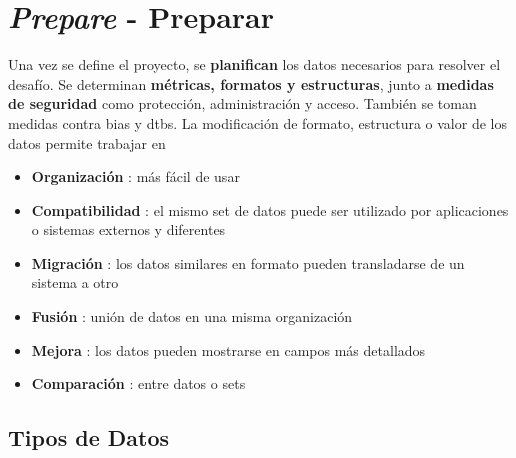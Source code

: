 

\section{\textit{Prepare} - Preparar}
Una vez se define el proyecto, se \textbf{planifican} los datos necesarios para resolver el desafío. Se determinan \textbf{métricas, formatos y estructuras}, junto a \textbf{medidas de seguridad} como protección, administración y acceso. También se toman medidas contra \gls{bias} y \gls{dtbs}. La modificación de formato, estructura o valor de los datos permite trabajar en
\begin{itemize}
    \item {\textbf{Organización} : más fácil de usar}
    \item {\textbf{Compatibilidad} : el mismo set de datos puede ser utilizado por aplicaciones o sistemas externos y diferentes}
    \item {\textbf{Migración} : los datos similares en formato pueden transladarse de un sistema a otro}
    \item {\textbf{Fusión} : unión de datos en una misma organización}
    \item {\textbf{Mejora} : los datos pueden mostrarse en campos más detallados}
    \item {\textbf{Comparación} : entre datos o sets}
\end{itemize}

\subsection{Tipos de Datos}
